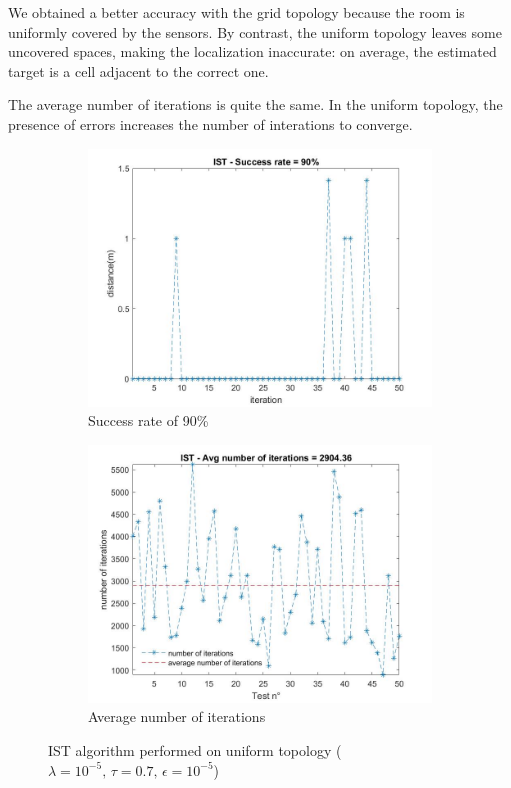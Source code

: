 We obtained a better accuracy with the grid topology because the room is uniformly covered by the sensors. By contrast, 
the uniform topology leaves some uncovered spaces, making the localization inaccurate: on average, the estimated
target is a cell adjacent to the correct one.\par
The average number of iterations is quite the same. In the uniform topology, the presence of errors increases the number of interations
to converge.

\begin{figure}[H]
    \begin{subfigure}{0.45\textwidth}
        \centering
        \includegraphics[width=\textwidth]{img/IST_distance_uniform.jpg}
        \caption{Success rate of 90\%}
    \end{subfigure}
    \hfill
    \begin{subfigure}{0.45\textwidth}
        \centering
        \includegraphics[width=\textwidth]{img/IST_num_iterations_uniform.jpg}
        \caption{Average number of iterations}
    \end{subfigure}
    \caption{IST algorithm performed on uniform topology ($\lambda=10^{-5},\,\tau=0.7,\,\epsilon=10^{-5}$)}
\end{figure}

